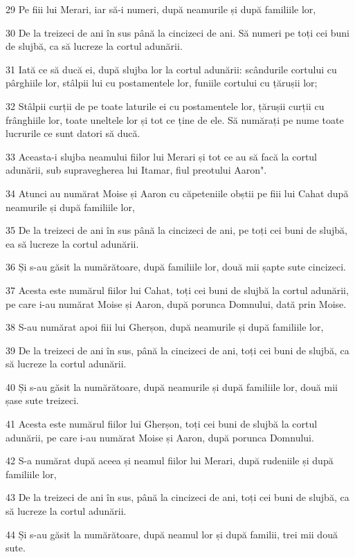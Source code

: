 \par 29 Pe fiii lui Merari, iar să-i numeri, după neamurile și după familiile lor,
\par 30 De la treizeci de ani în sus până la cincizeci de ani. Să numeri pe toți cei buni de slujbă, ca să lucreze la cortul adunării.
\par 31 Iată ce să ducă ei, după slujba lor la cortul adunării: scândurile cortului cu pârghiile lor, stâlpii lui cu postamentele lor, funiile cortului cu țărușii lor;
\par 32 Stâlpii curții de pe toate laturile ei cu postamentele lor, țărușii curții cu frânghiile lor, toate uneltele lor și tot ce ține de ele. Să numărați pe nume toate lucrurile ce sunt datori să ducă.
\par 33 Aceasta-i slujba neamului fiilor lui Merari și tot ce au să facă la cortul adunării, sub supravegherea lui Itamar, fiul preotului Aaron".
\par 34 Atunci au numărat Moise și Aaron cu căpeteniile obștii pe fiii lui Cahat după neamurile și după familiile lor,
\par 35 De la treizeci de ani în sus până la cincizeci de ani, pe toți cei buni de slujbă, ea să lucreze la cortul adunării.
\par 36 Și s-au găsit la numărătoare, după familiile lor, două mii șapte sute cincizeci.
\par 37 Acesta este numărul fiilor lui Cahat, toți cei buni de slujbă la cortul adunării, pe care i-au numărat Moise și Aaron, după porunca Domnului, dată prin Moise.
\par 38 S-au numărat apoi fiii lui Gherșon, după neamurile și după familiile lor,
\par 39 De la treizeci de ani în sus, până la cincizeci de ani, toți cei buni de slujbă, ca să lucreze la cortul adunării.
\par 40 Și s-au găsit la numărătoare, după neamurile și după familiile lor, două mii șase sute treizeci.
\par 41 Acesta este numărul fiilor lui Gherșon, toți cei buni de slujbă la cortul adunării, pe care i-au numărat Moise și Aaron, după porunca Domnului.
\par 42 S-a numărat după aceea și neamul fiilor lui Merari, după rudeniile și după familiile lor,
\par 43 De la treizeci de ani în sus, până la cincizeci de ani, toți cei buni de slujbă, ca să lucreze la cortul adunării.
\par 44 Și s-au găsit la numărătoare, după neamul lor și după familii, trei mii două sute.
